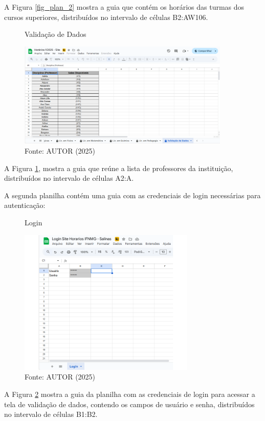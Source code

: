 A Figura \ref{fig_plan_2} mostra a guia que contém os horários das turmas dos cursos superiores, distribuídos no intervalo de células B2:AW106.

\begin{figure}[H]
    \centering
    \caption{Validação de Dados}
    \includegraphics[width=0.9\textwidth]{Figuras/plan-3.png}
    \caption*{Fonte: AUTOR (2025)}
    \label{fig_plan_3}
\end{figure}

A Figura \ref{fig_plan_3}, mostra a guia que reúne a lista de professores da instituição, distribuídos no intervalo de células A2:A.

A segunda planilha contém uma guia com as credenciais de login necessárias para autenticação:

\begin{figure}[htb]
    \centering
    \caption{Login}
    \includegraphics[width=0.75\textwidth]{Figuras/plan-4.png}
    \caption*{Fonte: AUTOR (2025)}
    \label{fig_plan_4}
\end{figure}

A Figura \ref{fig_plan_4} mostra a guia da planilha com as credenciais de login para acessar a tela de validação de dados, contendo os campos de usuário e senha, distribuídos no intervalo de células B1:B2.

